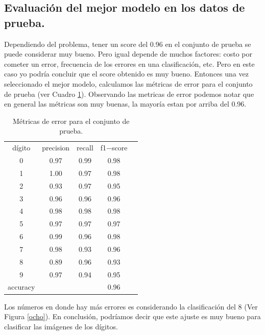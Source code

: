 \documentclass[paper=letter, fontsize=11pt]{scrartcl}
\numberwithin{equation}{section} %
\numberwithin{figure}{section} %
\numberwithin{table}{section} %
\begin{document}
\subsection{Evaluación del mejor modelo en los datos de prueba.}
Dependiendo del problema, tener un score del 0.96 en el conjunto de prueba se puede considerar muy bueno. Pero igual depende de muchos factores: costo por cometer un error, frecuencia de los errores en una clasificación, etc. Pero en este caso yo podría concluir que el score obtenido es muy bueno. Entonces una vez seleccionado el mejor modelo, calculamos las métricas de error para el conjunto de prueba (ver Cuadro \ref{error}). Observando las metricas de error podemos notar que en general las métricas son muy buenas, la mayoría estan por arriba del 0.96. 
\begin{table}[H]
    \centering 
        \begin{tabular}{|c|c|c|c|c}
        \hline
dígito  & precision &  recall & f1$-$score\\
0       &  0.97  &  0.99   & 0.98\\  
1       &  1.00  &  0.97   & 0.98\\  
2       &  0.93  &  0.97   & 0.95\\  
3       &  0.96  &  0.96   & 0.96\\  
4       &  0.98  &  0.98   & 0.98\\  
5       &  0.97  &  0.97   & 0.97\\  
6       &  0.99  &  0.96   & 0.98\\  
7       &  0.98  &  0.93   & 0.96\\  
8       &  0.89  &  0.96   & 0.93\\  
9       &  0.97  &  0.94   & 0.95\\  \hline \hline
accuracy  & & & 0.96\\ \hline \hline
        \end{tabular}
        \caption{Métricas de error para el conjunto de prueba.} \label{error}  
\end{table}
Los números en donde hay más errores es considerando la clasificación del 8 (Ver Figura \ref{ocho}). En conclusión, podríamos decir que este ajuste es muy bueno para clasificar las imágenes de los dígitos.
\end{document}
